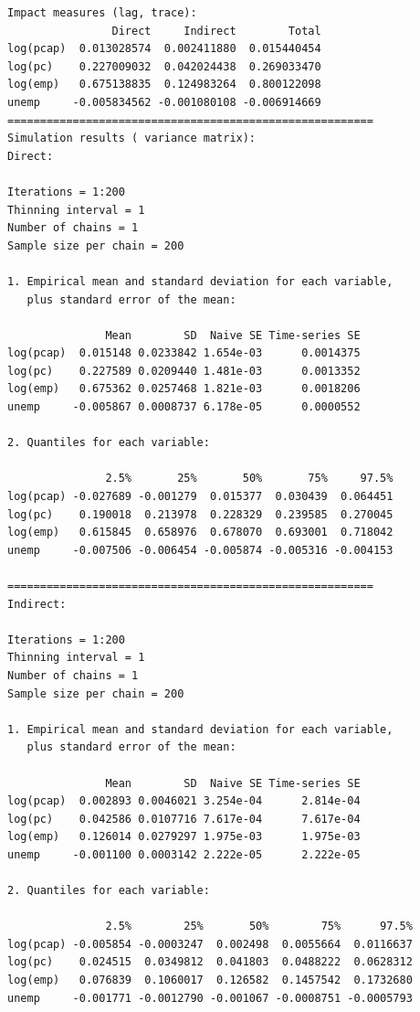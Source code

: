 \documentclass[
  letterpaper,
]{scrbook}
\begin{document}
\begin{verbatim}
Impact measures (lag, trace):
                Direct     Indirect        Total
log(pcap)  0.013028574  0.002411880  0.015440454
log(pc)    0.227009032  0.042024438  0.269033470
log(emp)   0.675138835  0.124983264  0.800122098
unemp     -0.005834562 -0.001080108 -0.006914669
========================================================
Simulation results ( variance matrix):
Direct:

Iterations = 1:200
Thinning interval = 1 
Number of chains = 1 
Sample size per chain = 200 

1. Empirical mean and standard deviation for each variable,
   plus standard error of the mean:

               Mean        SD  Naive SE Time-series SE
log(pcap)  0.015148 0.0233842 1.654e-03      0.0014375
log(pc)    0.227589 0.0209440 1.481e-03      0.0013352
log(emp)   0.675362 0.0257468 1.821e-03      0.0018206
unemp     -0.005867 0.0008737 6.178e-05      0.0000552

2. Quantiles for each variable:

               2.5%       25%       50%       75%     97.5%
log(pcap) -0.027689 -0.001279  0.015377  0.030439  0.064451
log(pc)    0.190018  0.213978  0.228329  0.239585  0.270045
log(emp)   0.615845  0.658976  0.678070  0.693001  0.718042
unemp     -0.007506 -0.006454 -0.005874 -0.005316 -0.004153

========================================================
Indirect:

Iterations = 1:200
Thinning interval = 1 
Number of chains = 1 
Sample size per chain = 200 

1. Empirical mean and standard deviation for each variable,
   plus standard error of the mean:

               Mean        SD  Naive SE Time-series SE
log(pcap)  0.002893 0.0046021 3.254e-04      2.814e-04
log(pc)    0.042586 0.0107716 7.617e-04      7.617e-04
log(emp)   0.126014 0.0279297 1.975e-03      1.975e-03
unemp     -0.001100 0.0003142 2.222e-05      2.222e-05

2. Quantiles for each variable:

               2.5%        25%       50%        75%      97.5%
log(pcap) -0.005854 -0.0003247  0.002498  0.0055664  0.0116637
log(pc)    0.024515  0.0349812  0.041803  0.0488222  0.0628312
log(emp)   0.076839  0.1060017  0.126582  0.1457542  0.1732680
unemp     -0.001771 -0.0012790 -0.001067 -0.0008751 -0.0005793


\end{verbatim}
\end{document}
